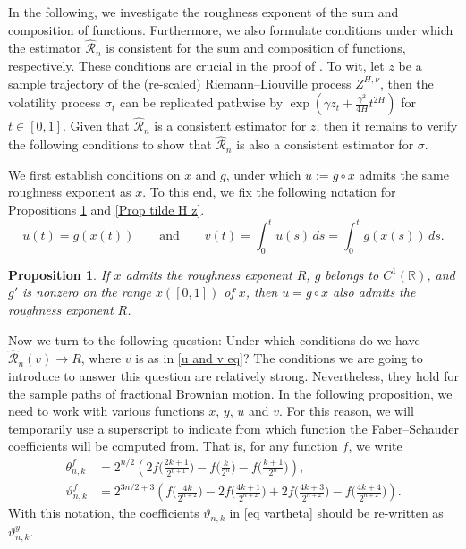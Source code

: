 \documentclass[12pt,reqno]{article}
\def\wh{\widehat}
\numberwithin{equation}{section}
\def\cR{{\mathscr R}}
\newtheorem{proposition}[theorem]{Proposition}
\theoremstyle{definition}
\def\wh{\widehat}
\newcommand{\bR}{\mathbb{R}}
\begin{document}
In the following, we investigate the roughness exponent of the sum and composition of functions. Furthermore, we also formulate conditions under which the estimator $\wh \cR_n$ is consistent for the sum and composition of functions, respectively. These conditions are crucial in the proof of . To wit, let $z$ be a sample trajectory of the (re-scaled) Riemann--Liouville process $Z^{H, \nu}$, then the volatility process $\sigma_t$ can be replicated pathwise by $\exp(\gamma z_t + \frac{\gamma^2}{4H}t^{2H})$ for $t \in [0,1]$. Given that $\wh \cR_n$ is a consistent estimator for $z$, then it remains to verify the following conditions to show that $\wh \cR_n$ is also a consistent estimator for $\sigma$.

We first establish conditions on $x$ and $g$, under which $u:=g\circ x$ admits the same roughness exponent as $x$. To this end, we fix the following notation for Propositions \ref{thm roughness composition} and \ref{Prop tilde H z}.
\begin{equation}\label{u and v eq}
u(t)=g(x(t))\qquad\text{and}\qquad v(t)=\int_0^tu(s)\,ds=\int_0^tg(x(s))\,ds.
\end{equation}
	
\begin{proposition}\label{thm roughness composition}
	If $x$ admits the roughness exponent ${R}$, $g$ belongs to $C^1(\bR)$, and $g'$ is nonzero on the range $x([0,1])$ of $x$, then $u = g\circ x$ also admits the roughness exponent ${R}$.
\end{proposition}

Now we turn to the following question: Under which conditions do we have $\wh\cR_n(v)\to {R}$, where $v$ is as in \eqref{u and v eq}? The conditions we are going to introduce to answer this question are relatively strong. Nevertheless, they hold for the sample paths of fractional Brownian motion. In the following proposition, we need to work with various functions $x$, $y$, $u$ and $v$. For this reason, we will temporarily use a superscript to indicate from which function the Faber--Schauder coefficients will be computed from. That is, for any function $f$, we write
\begin{equation}\label{coefficients depending on f eq}
	\begin{split}
		\theta^f_{n,k}& = 2^{n/2}\left(2f\Big(\frac{2k+1}{2^{n+1}}\Big)-f\Big(\frac{k}{2^{n}}\Big) - f\Big(\frac{k+1}{2^{n}}\Big)\right), \\
		\vartheta^f_{n,k}&= 2^{3n/2+3}\left(f\Big(\frac{4k}{2^{n+2}}\Big)-2f\Big(\frac{4k+1}{2^{n+2}}\Big)+2f\Big(\frac{4k+3}{2^{n+2}}\Big)-f\Big(\frac{4k+4}{2^{n+2}}\Big)\right).
	\end{split}
\end{equation}
 With this notation, the coefficients $\vartheta_{n,k}$ in \eqref{eq vartheta} should be re-written as $\vartheta_{n,k}^y$.
\end{document}

